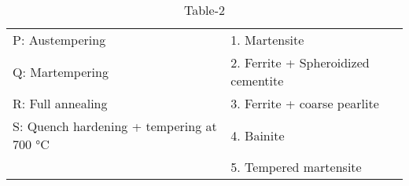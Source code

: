 
\begin{table}[htbp]
\caption{Table-2}
\label{table2}
\begin{tabular}{l l}
P: Austempering & 1. Martensite \\
Q: Martempering & 2. Ferrite + Spheroidized cementite \\
R: Full annealing & 3. Ferrite + coarse pearlite \\
S: Quench hardening + tempering at 700 °C & 4. Bainite \\
& 5. Tempered martensite \\
\end{tabular}
\end{table}